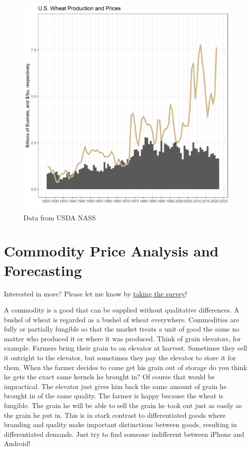 \documentclass[
  letterpaper,
  DIV=11,
  numbers=noendperiod]{scrreprt}
\begin{document}
\begin{figure}

{\centering \includegraphics{assets/PrimerforGrain_WheatProdand$.png}

}

\caption{Data from USDA NASS}

\end{figure}


\hypertarget{commodity-price-analysis-and-forecasting}{%
\chapter{Commodity Price Analysis and
Forecasting}\label{commodity-price-analysis-and-forecasting}}

{Interested in more? Please let me know by}
\href{https://forms.gle/Q3VByCQZHjfQSy9D7}{taking the survey}!

A commodity is a good that can be supplied without qualitative
differences. A bushel of wheat is regarded as a bushel of wheat
everywhere. Commodities are fully or partially fungible so that the
market treats a unit of good the same no matter who produced it or where
it was produced. Think of grain elevators, for example. Farmers bring
their grain to an elevator at harvest. Sometimes they sell it outright
to the elevator, but sometimes they pay the elevator to store it for
them. When the farmer decides to come get his grain out of storage do
you think he gets the exact same kernels he brought in? Of course that
would be impractical. The elevator just gives him back the same amount
of grain he brought in of the same quality. The farmer is happy because
the wheat is fungible. The grain he will be able to sell the grain he
took out just as easily as the grain he put in. This is in stark
contrast to differentiated goods where branding and quality make
important distinctions between goods, resulting in differentiated
demands. Just try to find someone indifferent between iPhone and
Android!
\end{document}
